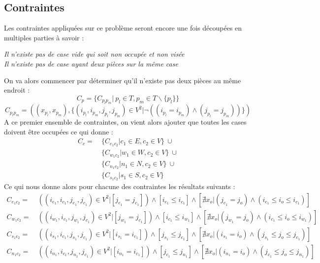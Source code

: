 \documentclass[a4paper]{article}
\begin{document}
\subsection{Contraintes}
Les contraintes appliquées sur ce problème seront encore une fois découpées en multiples parties à savoir : 
\begin{center}
\textit{Il n'existe pas de case vide qui soit non occupée et non visée} \vspace{0.1cm} \\
\textit{Il n'existe pas de case ayant deux pièces sur la même case}
\end{center}
On va alors commencer par déterminer qu'il n'existe pas deux pièces au même endroit : 
\begin{equation*}
C_p = \{ C_{p_lp_m} | \ p_l \in T, p_m \in T \backslash \{ p_l \} \}
\end{equation*}
\begin{equation*}
C_{p_lp_m} = ((x_{p_l},x_{p_m}), \{ (i_{p_l},i_{p_m},j_{p_l},j_{p_m}) \in V^2 | \neg((i_{p_l} = i_{p_m}) \wedge (j_{p_l} = j_{p_m}))  \}  )
\end{equation*}
A ce premier ensemble de contraintes, on vient alors ajouter que toutes les cases doivent être occupées ce qui donne : 
\begin{align*}
C_c = \ & \{ C_{e_1c_2} | c_1 \in E, c_2 \in  V \} \ \cup \\
 & \{ C_{w_1c_2} | w_1 \in W, c_2 \in V \} \ \cup \\
 & \{ C_{n_1c_2} | n_1 \in N, c_2 \in V \} \ \cup \\
 & \{ C_{s_1c_2} | s_1 \in S, c_2 \in V \} 
\end{align*}
Ce qui nous donne alors pour chacune des contraintes les résultats suivants : 
\begin{align*}
C_{e_1c_2} = & \ ( (i_{e_1},i_{c_1},j_{e_1},j_{c_1}) \in V^2 | [ j_{e_1} = j_{c_1} ] ) \wedge [i_{e_1} \leq i_{c_1}] \wedge [\nexists x_o | (j_{e_1} = j_o) \wedge (i_{e_1} \leq i_{o} \leq i_{c_1})] \\
C_{w_1c_2} = & \ ( (i_{w_1},i_{c_1},j_{w_1},j_{c_1}) \in V^2 | [ j_{w_1} = j_{c_1} ] ) \wedge [i_{c_1} \leq i_{w_1}] \wedge [\nexists x_o | (j_{w_1} = j_o) \wedge (i_{c_1} \leq i_{o} \leq i_{w_1})] \\
C_{s_1c_2} = & \ ( (i_{s_1},i_{c_1},j_{s_1},j_{c_1}) \in V^2 | [ i_{s_1} = i_{c_1} ] ) \wedge [j_{s_1} \leq j_{c_1}] \wedge [\nexists x_o | (i_{s_1} = i_o) \wedge (j_{s_1} \leq j_{o} \leq j_{c_1})] \\
C_{n_1c_2} = & \ ( (i_{n_1},i_{c_1},j_{n_1},j_{c_1}) \in V^2 | [ i_{n_1} = i_{c_1} ] ) \wedge [j_{c_1} \leq j_{n_1}] \wedge [\nexists x_o | (i_{n_1} = i_o) \wedge (j_{c_1} \leq j_{o} \leq j_{n_1})] 
\end{align*}
\end{document}
